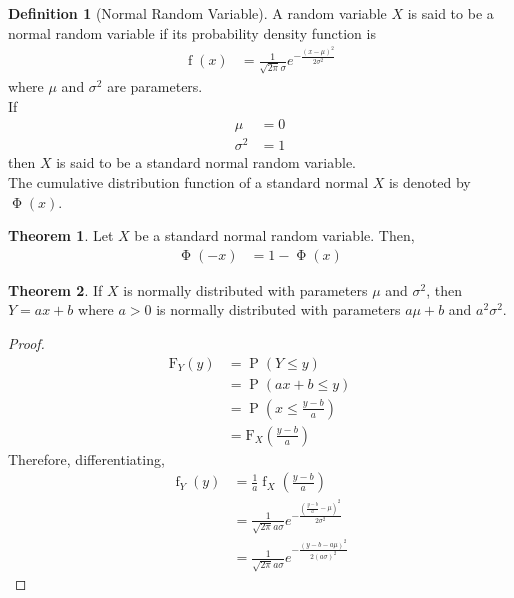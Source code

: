 \documentclass[titlepage, fleqn, a4paper, 12pt, twoside]{article}
\theoremstyle{definition}
\newtheorem{definition}{Definition}
\theoremstyle{theorem}
\newtheorem{theorem}{Theorem}
\DeclareMathOperator{\prob}{\mathrm{P}}
\DeclareMathOperator{\pdf}{\mathrm{f}}
\DeclareMathOperator{\stdnormalcdf}{\mathrm{\Phi}}
\newcommand*{\cdf}[1]{\mathrm{F}_{#1}}
\begin{document}
\begin{definition}[Normal Random Variable]
	A random variable $X$ is said to be a normal random variable if its probability density function is
	\begin{align*}
		\pdf(x) &= \frac{1}{\sqrt{2 \pi} \sigma} e^{-\frac{(x - \mu)^2}{2 \sigma^2}}
	\end{align*}
	where $\mu$ and $\sigma^2$ are parameters.\\
	If
	\begin{align*}
		\mu &= 0\\
		\sigma^2 &= 1
	\end{align*}
	then $X$ is said to be a standard normal random variable.\\
	The cumulative distribution function of a standard normal $X$ is denoted by $\stdnormalcdf(x)$.
\end{definition}

\begin{theorem}
	Let $X$ be a standard normal random variable.
	Then,
	\begin{align*}
		\stdnormalcdf(-x) &= 1 - \stdnormalcdf(x)
	\end{align*}
\end{theorem}

\begin{theorem}
	If $X$ is normally distributed with parameters $\mu$ and $\sigma^2$, then $Y = a x + b$ where $a > 0$ is normally distributed with parameters $a \mu + b$ and $a^2 \sigma^2$.
\end{theorem}

\begin{proof}
	\begin{align*}
		\cdf{Y}(y) &= \prob(Y \le y)\\
		&= \prob(a x + b \le y)\\
		&= \prob\left( x \le \frac{y - b}{a} \right)\\
		&= \cdf{X}\left( \frac{y - b}{a} \right)
	\end{align*}
	Therefore, differentiating,
	\begin{align*}
		\pdf_Y(y) &= \frac{1}{a} \pdf_X\left( \frac{y - b}{a} \right)\\
		&= \frac{1}{\sqrt{2 \pi} a \sigma} e^{-\frac{\left( \frac{y - b}{a} - \mu \right)^2}{2 \sigma^2}}\\
		&= \frac{1}{\sqrt{2 \pi} a \sigma} e^{-\frac{(y - b - a \mu)^2}{2 (a \sigma)^2}}
	\end{align*}
\end{proof}
\end{document}
